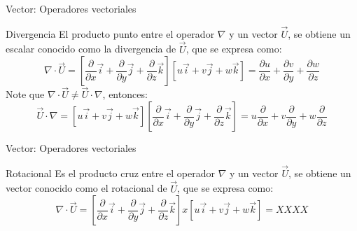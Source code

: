 \documentclass [xcolor=svgnames, t] {beamer}
\begin{document}
\begin{frame}{Vector: Operadores vectoriales}
\begin{block}{Divergencia}
El producto punto entre el operador $\nabla$ y un vector $\vec{U}$, se obtiene un escalar conocido como la divergencia de $\vec{U}$, que se expresa como:
\begin{equation}
\nabla \cdot \vec{U} = \left[ \frac{\partial }{\partial x}\vec{i} + \frac{\partial }{\partial y}\vec{j} + \frac{\partial }{\partial z}\vec{k} \right] [u\vec{i}+v\vec{j}+w\vec{k}] = \frac{\partial u}{\partial x}+\frac{\partial v}{\partial y}+\frac{\partial w}{\partial z}
\label{di1}
\end{equation}
Note que $\nabla \cdot \vec{U} \ne \vec{U} \cdot \nabla$, entonces:
\begin{equation*}
\vec{U} \cdot \nabla  = [u\vec{i}+v\vec{j}+w\vec{k}] \left[ \frac{\partial }{\partial x}\vec{i} + \frac{\partial }{\partial y}\vec{j} + \frac{\partial }{\partial z}\vec{k} \right]  = u\frac{\partial}{\partial x}+v\frac{\partial}{\partial y}+w\frac{\partial}{\partial z}
\end{equation*}
\end{block}
\end{frame}

\begin{frame}{Vector: Operadores vectoriales}
\begin{block}{Rotacional}
Es el producto cruz entre el operador $\nabla$ y un vector $\vec{U}$, se obtiene un vector conocido como el rotacional de $\vec{U}$, que se expresa como:
\begin{equation}
\nabla \cdot \vec{U} = \left[ \frac{\partial }{\partial x}\vec{i} + \frac{\partial }{\partial y}\vec{j} + \frac{\partial }{\partial z}\vec{k} \right] x [u\vec{i}+v\vec{j}+w\vec{k}] = XXXX
\label{rot}
\end{equation}
\end{block}
\end{frame}
\end{document}

